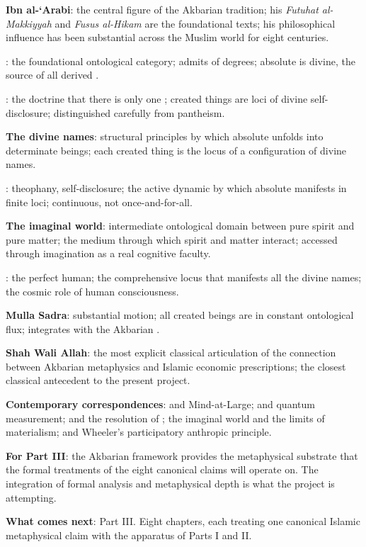 \begin{summarybox}
\textbf{Ibn al-`Arabi}: the central figure of the Akbarian tradition;
his \textit{Futuhat al-Makkiyyah} and \textit{Fusus al-Hikam} are
the foundational texts; his philosophical influence has been
substantial across the Muslim world for eight centuries.

\textbf{}: the foundational ontological category; admits
of degrees; absolute  is divine, the source of all
derived .

\textbf{}: the doctrine that there is only one
; created things are loci of divine self-disclosure;
distinguished carefully from pantheism.

\textbf{The divine names}: structural principles by which absolute
 unfolds into determinate beings; each created thing is
the locus of a configuration of divine names.

\textbf{}: theophany, self-disclosure; the active
dynamic by which absolute  manifests in finite loci;
continuous, not once-and-for-all.

\textbf{The imaginal world}: intermediate ontological domain
between pure spirit and pure matter; the medium through which
spirit and matter interact; accessed through imagination as a real
cognitive faculty.

\textbf{}: the perfect human; the comprehensive
locus that manifests all the divine names; the cosmic role of
human consciousness.

\textbf{Mulla Sadra}: substantial motion; all created beings are in
constant ontological flux; integrates with the Akbarian
.

\textbf{Shah Wali Allah}: the most explicit classical articulation
of the connection between Akbarian metaphysics and Islamic economic
prescriptions; the closest classical antecedent to the present
project.

\textbf{Contemporary correspondences}:  and Mind-at-Large;
 and quantum measurement;  and the
resolution of ; the imaginal world and the limits of
materialism;  and Wheeler's participatory
anthropic principle.

\textbf{For Part III}: the Akbarian framework provides the
metaphysical substrate that the formal treatments of the eight
canonical claims will operate on. The integration of formal
analysis and metaphysical depth is what the project is attempting.

\textbf{What comes next}: Part III. Eight chapters, each treating
one canonical Islamic metaphysical claim with the apparatus of
Parts I and II.
\end{summarybox}

\cleardoublepage
